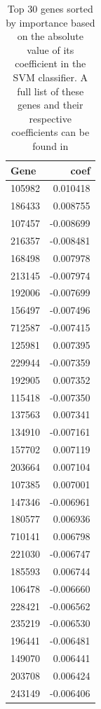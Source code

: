 \documentclass[twocolumn]{article}
\begin{document}
\begin{table}[H]
    \centering
    \begin{tabular}{lr}
\toprule
Gene & coef \\
\midrule
105982 & 0.010418 \\
186433 & 0.008755 \\
107457 & -0.008699 \\
216357 & -0.008481 \\
168498 & 0.007978 \\
213145 & -0.007974 \\
192006 & -0.007699 \\
156497 & -0.007496 \\
712587 & -0.007415 \\
125981 & 0.007395 \\
229944 & -0.007359 \\
192905 & 0.007352 \\
115418 & -0.007350 \\
137563 & 0.007341 \\
134910 & -0.007161 \\
157702 & 0.007119 \\
203664 & 0.007104 \\
107385 & 0.007001 \\
147346 & -0.006961 \\
180577 & 0.006936 \\
710141 & 0.006798 \\
221030 & -0.006747 \\
185593 & 0.006744 \\
106478 & -0.006660 \\
228421 & -0.006562 \\
235219 & -0.006530 \\
196441 & -0.006481 \\
149070 & 0.006441 \\
203708 & 0.006424 \\
243149 & -0.006406 \\
\bottomrule
\end{tabular}
    \caption{Top 30 genes sorted by importance based on the absolute value of its coefficient in the SVM classifier. A full list of these genes and their respective coefficients can be found in }
    \label{tab:genes-svm}
\end{table}
\end{document}

